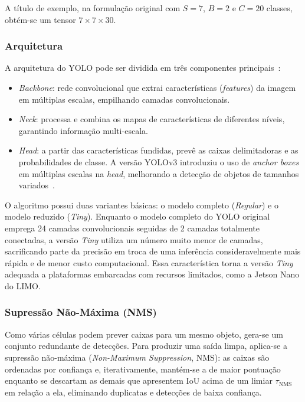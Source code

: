 A título de exemplo, na formulação original com $S = 7$, $B = 2$ e $C = 20$
classes, obtém-se um tensor $7 \times 7 \times 30$.

\subsubsection{Arquitetura}

A arquitetura do YOLO pode ser dividida em três componentes
principais~\cite{ali2024yolo}:

\begin{itemize}
  \item \textit{Backbone}: rede convolucional que extrai características
  (\textit{features}) da imagem em múltiplas escalas, empilhando camadas
  convolucionais.
  \item \textit{Neck}: processa e combina os mapas de características de
  diferentes níveis, garantindo informação multi-escala.
  \item \textit{Head}: a partir das características fundidas, prevê as
  caixas delimitadoras e as probabilidades de classe. A versão YOLOv3 introduziu
  o uso de \textit{anchor boxes} em múltiplas escalas na \textit{head},
  melhorando a detecção de objetos de tamanhos variados~\cite{jiang2022yolo}.
\end{itemize}

O algoritmo possui duas variantes básicas: o modelo completo (\textit{Regular})
e o modelo reduzido (\textit{Tiny}). Enquanto o modelo completo do YOLO original
emprega 24 camadas convolucionais seguidas de 2 camadas totalmente conectadas, a
versão \textit{Tiny} utiliza um número muito menor de camadas, sacrificando parte
da precisão em troca de uma inferência consideravelmente mais rápida e de menor
custo computacional. Essa característica torna a versão \textit{Tiny} adequada a
plataformas embarcadas com recursos limitados, como a Jetson Nano do LIMO.

\subsubsection{Supressão Não-Máxima (NMS)}

Como várias células podem prever caixas para um mesmo objeto, gera-se um conjunto
redundante de detecções. Para produzir uma saída limpa, aplica-se a supressão
não-máxima (\textit{Non-Maximum Suppression}, NMS): as caixas são ordenadas por
confiança e, iterativamente, mantém-se a de maior pontuação enquanto se descartam
as demais que apresentem IoU acima de um limiar $\tau_{\text{NMS}}$ em relação a
ela, eliminando duplicatas e detecções de baixa confiança.

